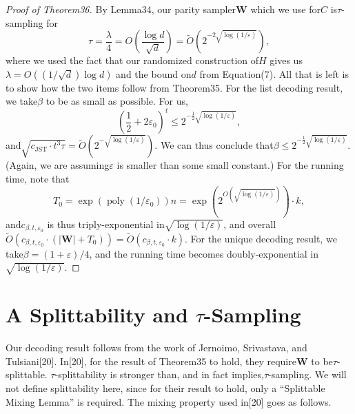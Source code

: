 \documentclass[10pt,a4paper]{article}
\begin{document}
\begin{proof}[Proof of Theorem36]
By Lemma34, our parity sampler$\mathbf W$ which we use for$C$ is$\tau$-sampling for
\[\tau=\frac\lambda4=O\left(\frac{\log d}{\sqrt d}\right)=\widetilde O(2^{-2\sqrt{\log(1/\varepsilon)}}),\]
where we used the fact that our randomized construction of$H$ gives us$\lambda=O((1/\sqrt d)\log d)$ and the bound on$d$ from Equation(7). All that is left is to show how the two items follow from Theorem35. For the list decoding result, we take$\beta$ to be as small as possible. For us,
\[\left(\frac12+2\varepsilon_0\right)^t\leq2^{-\frac12\sqrt{\log(1/\varepsilon)}},\]
and$\sqrt{c_{\mathrm{JST}}\cdot t^3\tau}=\widetilde O(2^{-\sqrt{\log(1/\varepsilon)}})$. We can thus conclude that$\beta\leq2^{-\frac12\sqrt{\log(1/\varepsilon)}}$. (Again, we are assuming$\varepsilon$ is smaller than some small constant.) For the running time, note that
\[T_0=\exp(\operatorname{poly}(1/\varepsilon_0))n=\exp\left(2^{O(\sqrt{\log(1/\varepsilon)})}\right)\cdot k,\]
and$c_{\beta,t,\varepsilon_0}$ is thus triply-exponential in$\sqrt{\log(1/\varepsilon)}$, and overall$\widetilde O(c_{\beta,t,\varepsilon_0}\cdot(|\mathbf W|+T_0))=\widetilde O(c_{\beta,t,\varepsilon_0}\cdot k)$. For the unique decoding result, we take$\beta=(1+\varepsilon)/4$, and the running time becomes doubly-exponential in$\sqrt{\log(1/\varepsilon)}$.
\end{proof}

\section*{A Splittability and $\tau$-Sampling}
Our decoding result follows from the work of Jernoimo, Srivastava, and Tulsiani[20]. In[20], for the result of Theorem35 to hold, they require$\mathbf W$ to be$\tau$-splittable. $\tau$-splittability is stronger than, and in fact implies,$\tau$-sampling. We will not define splittability here, since for their result to hold, only a ``Splittable Mixing Lemma'' is required. The mixing property used in[20] goes as follows.
\end{document}
